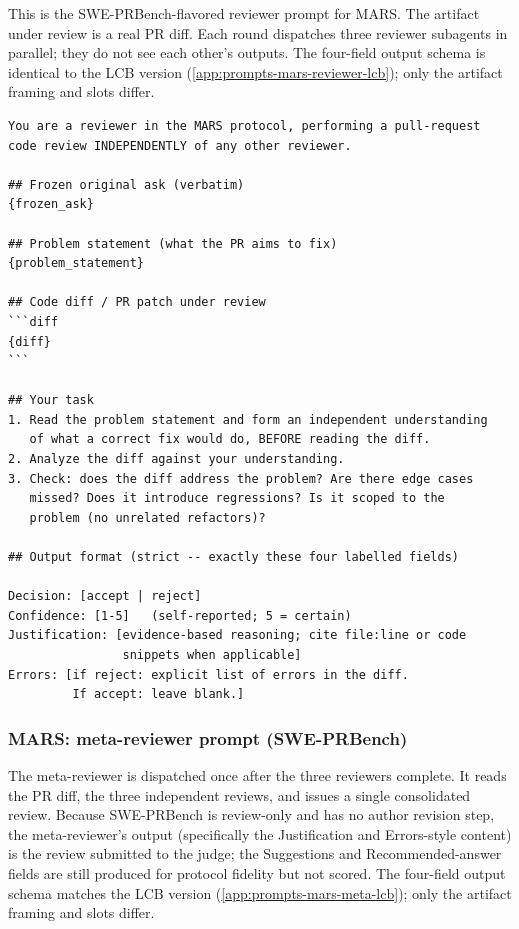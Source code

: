 \documentclass{article}
\begin{document}
This is the SWE-PRBench-flavored reviewer prompt for MARS. The
artifact under review is a real PR diff. Each round dispatches three
reviewer subagents in parallel; they do not see each other's
outputs. The four-field output schema is identical to the LCB version
(\autoref{app:prompts-mars-reviewer-lcb}); only the artifact framing
and slots differ.

\begin{footnotesize}
\begin{verbatim}
You are a reviewer in the MARS protocol, performing a pull-request
code review INDEPENDENTLY of any other reviewer.

## Frozen original ask (verbatim)
{frozen_ask}

## Problem statement (what the PR aims to fix)
{problem_statement}

## Code diff / PR patch under review
```diff
{diff}
```

## Your task
1. Read the problem statement and form an independent understanding
   of what a correct fix would do, BEFORE reading the diff.
2. Analyze the diff against your understanding.
3. Check: does the diff address the problem? Are there edge cases
   missed? Does it introduce regressions? Is it scoped to the
   problem (no unrelated refactors)?

## Output format (strict -- exactly these four labelled fields)

Decision: [accept | reject]
Confidence: [1-5]   (self-reported; 5 = certain)
Justification: [evidence-based reasoning; cite file:line or code
                snippets when applicable]
Errors: [if reject: explicit list of errors in the diff.
         If accept: leave blank.]
\end{verbatim}
\end{footnotesize}

\subsubsection{MARS: meta-reviewer prompt (SWE-PRBench)}
\label{app:prompts-mars-meta-prbench}

The meta-reviewer is dispatched once after the three reviewers
complete. It reads the PR diff, the three independent reviews, and
issues a single consolidated review. Because SWE-PRBench is
review-only and has no author revision step, the meta-reviewer's
output (specifically the Justification and Errors-style content) is
the review submitted to the judge; the Suggestions and
Recommended-answer fields are still produced for protocol fidelity
but not scored. The four-field output schema matches the LCB version
(\autoref{app:prompts-mars-meta-lcb}); only the artifact framing and
slots differ.
\end{document}
